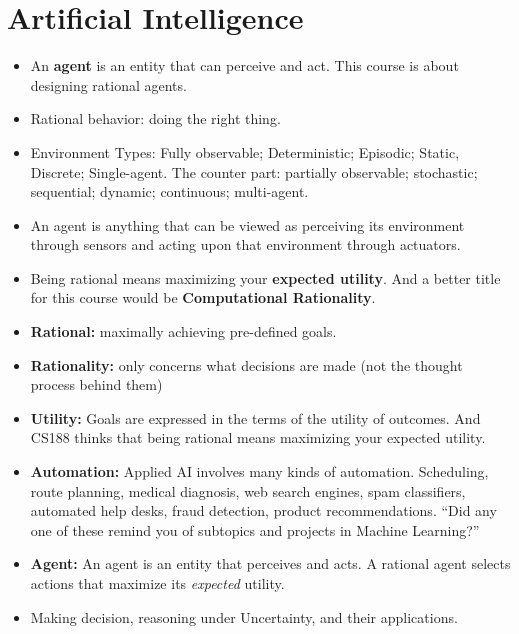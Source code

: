 \documentclass[twocolumn]{article}
\begin{document}
\section{Artificial Intelligence}
\label{sec:artif-intell}

\begin{itemize}
\item An \textbf{agent} is an entity that can perceive and act. This
  course is about designing rational agents. 
\item Rational behavior: doing the right thing. 
\item Environment Types: Fully observable; Deterministic; Episodic;
  Static, Discrete; Single-agent. The counter part: partially
  observable; stochastic; sequential; dynamic; continuous;
  multi-agent. 
\item An agent is anything that can be viewed as perceiving its
  environment through sensors and acting upon that environment through
  actuators.
\item Being rational means maximizing your \textbf{expected
    utility}. And a better title for this course would be
  \textbf{Computational Rationality}.
\item \textbf{Rational:} maximally achieving pre-defined goals.
\item \textbf{Rationality:} only concerns what decisions are made (not
  the thought process behind them)
\item \textbf{Utility:} Goals are expressed in the terms of the
  utility of outcomes. And CS188 thinks that being rational means
  maximizing your expected utility.
\item \textbf{Automation:} Applied AI involves many kinds of
  automation. Scheduling, route planning, medical diagnosis, web
  search engines, spam classifiers, automated help desks, fraud
  detection, product recommendations. ``Did any one of these remind
  you of subtopics and projects in Machine Learning?'' 
\item \textbf{Agent:} An agent is an entity that perceives and acts. A
  rational agent selects actions that maximize its \emph{expected}
  utility. 
\item Making decision, reasoning under Uncertainty, and their
  applications. 
\end{itemize}
\end{document}
